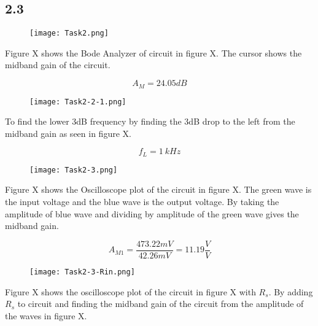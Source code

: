 \subsection*{2.3}
	\begin{figure}[h!]
	    \centering
	    \texttt{[image: Task2.png]}
	\end{figure}

	Figure X shows the Bode Analyzer of circuit in figure X. The cursor shows the midband gain of the circuit.

	$$ A_{M} = 24.05 dB $$ 

\pagebreak
    \begin{figure}[h]
        \centering
        \texttt{[image: Task2-2-1.png]}
    \end{figure}

	To find the lower 3dB frequency by finding the 3dB drop to the left from the midband gain 	as seen in figure X.

	$$ f_{L} = 1 \ k Hz $$

    \begin{figure}[h!]
        \centering
        \texttt{[image: Task2-3.png]}
    \end{figure}

	Figure X shows the Oscilloscope plot of the circuit in figure X. The green wave is the input voltage and the blue wave is the output voltage. By taking the amplitude of blue wave and dividing by amplitude of the green wave gives the midband gain.

	$$ A_{M1} = \frac{473.22 mV}{42.26 mV} = 11.19 \frac{V}{V} $$

\pagebreak

    \begin{figure}[h!]
        \centering
        \texttt{[image: Task2-3-Rin.png]}
    \end{figure}

	Figure X shows the oscilloscope plot of the circuit in figure X with $R_{s}$. By adding $R_{s}$ to circuit and finding the midband gain of the circuit from the amplitude of the waves in figure X.

